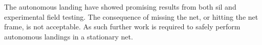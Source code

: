 The autonomous landing have showed promising results from both \gls{sil} and experimental field testing. The consequence of missing the net, or hitting the net frame, is not acceptable. As such further work is required to safely perform autonomous landings in a stationary net.








